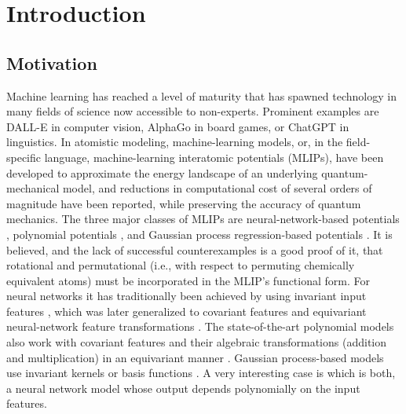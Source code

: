 \section{Introduction}

\subsection{Motivation}

Machine learning has reached a level of maturity that has spawned technology in many fields of science now accessible to non-experts.
Prominent examples are DALL-E in computer vision, AlphaGo in board games, or ChatGPT in linguistics.
In atomistic modeling, machine-learning models, or, in the field-specific language, machine-learning interatomic potentials (MLIPs), have been developed to approximate the energy landscape of an underlying quantum-mechanical model, and reductions in computational cost of several orders of magnitude have been reported, while preserving the accuracy of quantum mechanics.
The three major classes of MLIPs are neural-network-based potentials \citep{behler_generalized_2007, schutt_schnet_2017, smith_ani1_2017, wang2018-deepmd, pun_physically_2019, takamoto_teanet_2022, batzner_equivariant_2022}, polynomial potentials \cite{thompson_spectral_2015, shapeev_moment_2016, drautz_atomic_2019}, and Gaussian process regression-based potentials \citep{bartok_gaussian_2010,jinnouchi2020-gaussian,vandermause2020-gaussian}.
It is believed, and the lack of successful counterexamples is a good proof of it, that rotational and permutational (i.e., with respect to permuting chemically equivalent atoms) must be incorporated in the MLIP's functional form.
For neural networks it has traditionally been achieved by using invariant input features \citep{behler_generalized_2007,schutt_schnet_2017,smith_ani1_2017,pun_physically_2019,takamoto_teanet_2022}, which was later generalized to covariant features and equivariant neural-network feature transformations \cite{batzner_equivariant_2022}.
The state-of-the-art polynomial models also work with covariant features and their algebraic transformations (addition and multiplication) in an equivariant manner  \cite{thompson_spectral_2015, shapeev_moment_2016, drautz_atomic_2019}.
Gaussian process-based models use invariant kernels \citep{bartok_gaussian_2010} or basis functions \citep{jinnouchi2020-gaussian,vandermause2020-gaussian}.
A very interesting case is \cite{kondor_clebsch_2018} which is both, a neural network model whose output depends polynomially on the input features.

